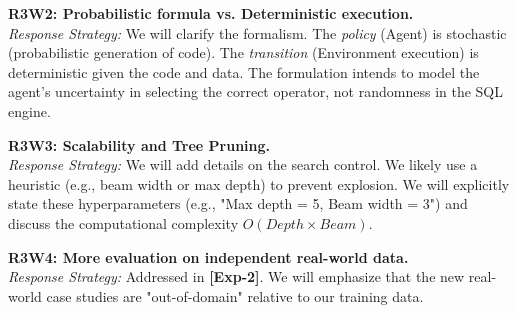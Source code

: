 \noindent \textbf{R3W2: Probabilistic formula vs. Deterministic execution.} \\
\textit{Response Strategy:} We will clarify the formalism. The \textit{policy} (Agent) is stochastic (probabilistic generation of code). The \textit{transition} (Environment execution) is deterministic given the code and data. The formulation intends to model the agent's uncertainty in selecting the correct operator, not randomness in the SQL engine.

\noindent \textbf{R3W3: Scalability and Tree Pruning.} \\
\textit{Response Strategy:} We will add details on the search control. We likely use a heuristic (e.g., beam width or max depth) to prevent explosion. We will explicitly state these hyperparameters (e.g., "Max depth = 5, Beam width = 3") and discuss the computational complexity $O(Depth \times Beam)$.

\noindent \textbf{R3W4: More evaluation on independent real-world data.} \\
\textit{Response Strategy:} Addressed in \textbf{[Exp-2]}. We will emphasize that the new real-world case studies are "out-of-domain" relative to our training data.
